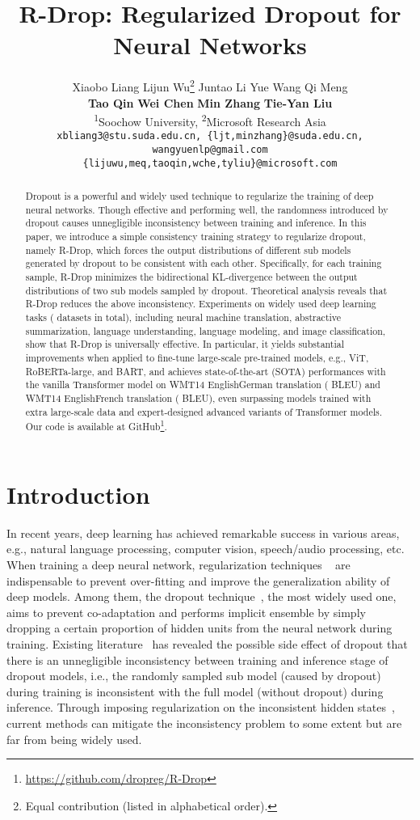 \documentclass{article}
\title{R-Drop: Regularized Dropout for Neural Networks}
\author{Xiaobo Liang\textsuperscript{\normalfont 1} \quad
    Lijun Wu\textsuperscript{\normalfont 2}\thanks{Equal contribution (listed in alphabetical order).} \quad
    Juntao Li\textsuperscript{\normalfont 1} \quad
    Yue Wang\textsuperscript{\normalfont 1} \quad
    Qi Meng\textsuperscript{\normalfont 2} \\
    {\bf Tao Qin}\textsuperscript{\normalfont 2} \quad
    {\bf Wei Chen}\textsuperscript{\normalfont 2} \quad
    {\bf Min Zhang}\textsuperscript{\normalfont 1} \quad
    {\bf Tie-Yan Liu}\textsuperscript{\normalfont 2} \quad
    \\ 
    \textsuperscript{1}Soochow University, \textsuperscript{2}Microsoft Research Asia \\
    \texttt{xbliang3@stu.suda.edu.cn, \{ljt,minzhang\}@suda.edu.cn, wangyuenlp@gmail.com} \\
    \texttt{\{lijuwu,meq,taoqin,wche,tyliu\}@microsoft.com} \\
}
\begin{document}
\maketitle

\begin{abstract}
Dropout is a powerful and widely used technique to regularize the training of deep neural networks.
Though effective and performing well, the randomness introduced by dropout causes unnegligible inconsistency between training and inference. 
In this paper, we introduce a simple consistency training strategy to regularize dropout, namely R-Drop, which forces the output distributions of different sub models generated by dropout to be consistent with each other.
Specifically, for each training sample, R-Drop minimizes the bidirectional KL-divergence between the output distributions of two sub models sampled by dropout.
Theoretical analysis reveals that R-Drop reduces the above inconsistency.
Experiments on  widely used deep learning tasks ( datasets in total), including neural machine translation, abstractive summarization, language understanding, language modeling, and image classification, show that R-Drop is universally effective. In particular, it yields substantial improvements when applied to fine-tune large-scale pre-trained models, e.g., ViT, RoBERTa-large, and BART, and achieves state-of-the-art (SOTA) performances with the vanilla Transformer model on WMT14 EnglishGerman translation ( BLEU) and WMT14 EnglishFrench translation ( BLEU), even surpassing models trained with extra large-scale data and expert-designed advanced variants of Transformer models.
Our code is available at GitHub\footnote{\url{https://github.com/dropreg/R-Drop}}.

\end{abstract}

\section{Introduction}
In recent years, deep learning has achieved remarkable success in various areas, e.g., natural language processing, computer vision, speech/audio processing, etc. 
When training a deep neural network, regularization techniques ~\cite{srivastava2014dropout,wan2013regularization,ioffe2015batch,ba2016layer,wu2018group,szegedy2016rethinking,hinton2015distilling,zhang2019your} are indispensable to prevent over-fitting and improve the generalization ability of deep models.
Among them, the dropout technique~\cite{hinton2012improving}, the most widely used one, aims to prevent co-adaptation and performs implicit ensemble by simply dropping a certain proportion of hidden units from the neural network during training.
Existing literature~\citep{ma2016dropout,zolna2017fraternal} has revealed the possible side effect of dropout that there is an unnegligible inconsistency between training and inference stage of dropout models, i.e., the randomly sampled sub model (caused by dropout) during training is inconsistent with the full model (without dropout) during inference.
Through imposing  regularization on the inconsistent hidden states~\citep{ma2016dropout,zolna2017fraternal}, current methods can mitigate the inconsistency problem to some extent but are far from being widely used.
\end{document}
